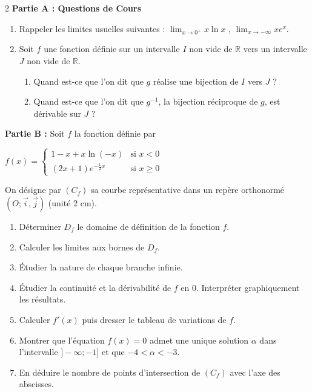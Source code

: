 \documentclass[12pt,a4paper]{article}
\begin{document}
\begin{multicols}{2}
\textbf{Partie A : Questions de Cours}

\begin{enumerate}
\item Rappeler les limites usuelles suivantes :  
\( \lim_{x\to 0^+} x\ln x \) , \quad
\( \lim_{x\to -\infty} xe^x. \)

\item Soit $f$ une fonction définie sur un intervalle $I$ non vide de $\mathbb{R}$ vers un intervalle $J$ non vide de $\mathbb{R}$.

\begin{enumerate}
\item Quand est-ce que l’on dit que $g$ réalise une bijection de $I$ vers $J$ ?
\item Quand est-ce que l’on dit que $g^{-1}$, la bijection réciproque de $g$, est dérivable sur $J$ ?
\end{enumerate}
\end{enumerate}

\textbf{Partie B :} Soit $f$ la fonction définie par

\(
f(x)=
\begin{cases}
1-x+x\ln(-x) & \text{si } x<0 \\[0.3cm]
(2x+1)e^{-\frac{1}{2}x} & \text{si } x\geq 0
\end{cases}
\)

On désigne par $(C_f)$ sa courbe représentative dans un repère orthonormé $(O;\vec{i},\vec{j})$ (unité 2 cm).

\begin{enumerate}
\item Déterminer $D_f$ le domaine de définition de la fonction $f$.

\item Calculer les limites aux bornes de $D_f$.

\item Étudier la nature de chaque branche infinie.

\item Étudier la continuité et la dérivabilité de $f$ en $0$. Interpréter graphiquement les résultats.

\item Calculer $f'(x)$ puis dresser le tableau de variations de $f$.

\item Montrer que l’équation \( f(x)=0 \) admet une unique solution $\alpha$ dans l’intervalle $]-\infty;-1]$ et que \( -4<\alpha<-3. \)

\item En déduire le nombre de points d’intersection de $(C_f)$ avec l’axe des abscisses.


\end{enumerate}
\end{multicols}
\end{document}
